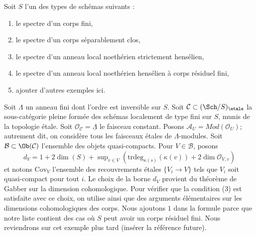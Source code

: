 \begin{example}
\label{example-etale}
Soit $S$ l'un des types de schémas suivants :
\begin{enumerate}
\item le spectre d'un corps fini,
\item le spectre d'un corps séparablement clos,
\item le spectre d'un anneau local noethérien strictement hensélien,
\item le spectre d'un anneau local noethérien hensélien
à corps résiduel fini,
\item ajouter d'autres exemples ici.
\end{enumerate}
Soit $\Lambda$ un anneau fini dont l'ordre est inversible sur $S$.
Soit $\mathcal{C} \subset (\Sch/S)_\etale$
la sous-catégorie pleine formée des schémas localement de type fini
sur $S$, munis de la topologie étale.
Soit $\mathcal{O}_\mathcal{C} = \underline{\Lambda}$ le
faisceau constant. Posons $\mathcal{A}_U = \textit{Mod}(\mathcal{O}_U)$;
autrement dit, on considère tous les faisceaux étales de $\Lambda$-modules.
Soit $\mathcal{B} \subset \Ob(\mathcal{C})$
l'ensemble des objets quasi-compacts. Pour $V \in \mathcal{B}$, posons
$$
d_V = 1 + 2\dim(S) +
\sup\nolimits_{v \in V}(\text{trdeg}_{\kappa(s)}(\kappa(v)) +
2 \dim \mathcal{O}_{V, v})
$$
et notons $\text{Cov}_V$ l'ensemble des recouvrements étales $\{V_i \to V\}$
tels que $V_i$ soit quasi-compact pour tout $i$.
Le choix de la borne $d_V$ provient du théorème de Gabber
sur la dimension cohomologique. Pour vérifier que la condition (3)
est satisfaite avec ce choix, on utilise
\cite[Expos\'e VIII-A, Corollary 1.2 and Lemma 2.2]{Traveaux}
ainsi que des arguments élémentaires sur les dimensions cohomologiques des corps.
Nous ajoutons $1$ dans la formule parce que notre liste contient des cas où $S$
peut avoir un corps résiduel fini.
Nous reviendrons sur cet exemple plus tard (insérer la référence future).
\end{example}

